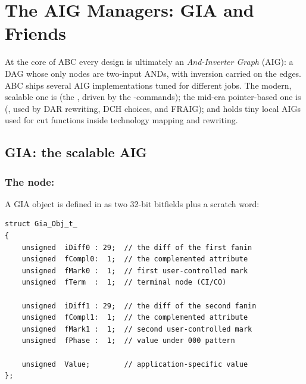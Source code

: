 \chapter{The AIG Managers: GIA and Friends}
\label{ch:aig}

At the core of ABC every design is ultimately an \emph{And-Inverter Graph}
(AIG): a DAG whose only nodes are two-input ANDs, with inversion carried on the
edges. ABC ships several AIG implementations tuned for different jobs. The
modern, scalable one is  (the , driven by the
\cmd{\&}-commands); the mid-era pointer-based one is 
(, used by DAR rewriting, DCH choices, and FRAIG); and
 holds tiny local AIGs used for cut functions inside technology
mapping and rewriting.


\section{GIA: the scalable AIG}

\subsection{The node: }

A GIA object is defined in  as two 32-bit bitfields plus
a scratch word:

\begin{lstlisting}[style=abccode]
struct Gia_Obj_t_
{
    unsigned  iDiff0 : 29;  // the diff of the first fanin
    unsigned  fCompl0:  1;  // the complemented attribute
    unsigned  fMark0 :  1;  // first user-controlled mark
    unsigned  fTerm  :  1;  // terminal node (CI/CO)

    unsigned  iDiff1 : 29;  // the diff of the second fanin
    unsigned  fCompl1:  1;  // the complemented attribute
    unsigned  fMark1 :  1;  // second user-controlled mark
    unsigned  fPhase :  1;  // value under 000 pattern

    unsigned  Value;        // application-specific value
};
\end{lstlisting}

